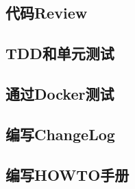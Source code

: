 \subsection{代码Review}

\subsection{TDD和单元测试}

\subsection{通过Docker测试}

\subsection{编写ChangeLog}

\subsection{编写HOWTO手册}
